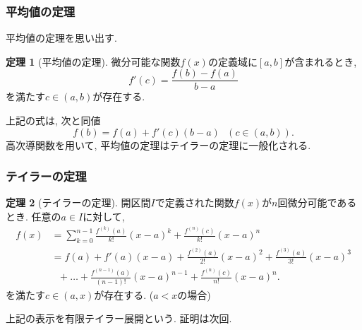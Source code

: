 \documentclass[dvipdfmx,cjk,10.2pt]{beamer}
\theoremstyle{definition}
\newtheorem{Thm}{定理}[section]
\begin{document}
\begin{frame}

\frametitle{平均値の定理}


平均値の定理を思い出す. 
\begin{Thm}[平均値の定理]
微分可能な関数$f(x)$の定義域に$[a,b]$が含まれるとき, %
$$
f'(c)=\frac{f(b)-f(a)}{b-a}
$$
を満たす$c \in (a,b)$が存在する. 
\end{Thm}

上記の式は, 次と同値
$$
f(b)=f(a)+f'(c)(b-a) \ \ \ (c \in (a,b)). 
$$
高次導関数を用いて, 平均値の定理はテイラーの定理に一般化される. 

\end{frame}







\begin{frame}
\frametitle{テイラーの定理}


\begin{Thm}[テイラーの定理] \label{テイラー}
開区間$I$で定義された関数$f(x)$が$n$回微分可能であるとき. 
任意の$a \in I$に対して, 
 \begin{align*}
f(x) & = \sum_{k=0}^{n-1}\frac{f^{(k)}(a)}{k!}(x-a)^k + \frac{f^{(n)}(c)}{k!}(x-a)^n \\
& =  f(a)+ f'(a)(x-a) + \frac{f^{(2)}(a)}{2!}(x-a)^2  + \frac{f^{(3)}(a)}{3!}(x-a)^3 \\
& \ \ \ + \dots + \frac{f^{(n-1)}(a)}{(n-1)!}(x-a)^{n-1}+\frac{f^{(n)}(c)}{n!}(x-a)^n . 
\end{align*}
を満たす$c \in (a,x)$が存在する. ($a<x$の場合) 
\end{Thm}
上記の表示を有限テイラー展開という. 
証明は次回. 


\end{frame}





\end{document}
